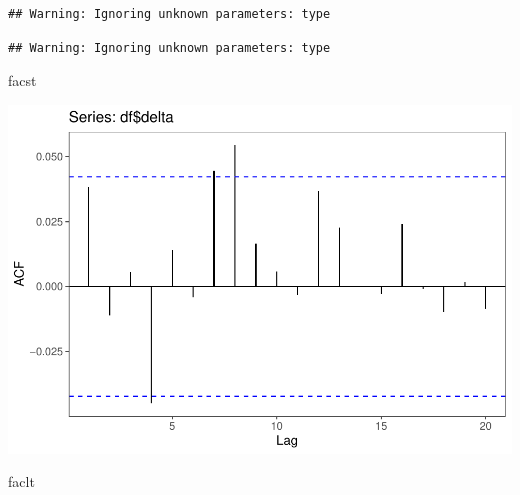 \documentclass[11pt, a4paper]{report}
\newenvironment{Shaded}{\begin{snugshade}}{\end{snugshade}}
\newcommand{\DataTypeTok}[1]{\textcolor[rgb]{0.13,0.29,0.53}{#1}}
\newcommand{\DecValTok}[1]{\textcolor[rgb]{0.00,0.00,0.81}{#1}}
\newcommand{\KeywordTok}[1]{\textcolor[rgb]{0.13,0.29,0.53}{\textbf{#1}}}
\newcommand{\NormalTok}[1]{#1}
\newcommand{\OperatorTok}[1]{\textcolor[rgb]{0.81,0.36,0.00}{\textbf{#1}}}
\newcommand{\StringTok}[1]{\textcolor[rgb]{0.31,0.60,0.02}{#1}}
\theoremstyle{plain}
\theoremstyle{plain}
\theoremstyle{remark}
\begin{document}
\begin{verbatim}
## Warning: Ignoring unknown parameters: type
\end{verbatim}

\begin{Shaded}
\end{Shaded}

\begin{verbatim}
## Warning: Ignoring unknown parameters: type
\end{verbatim}

\begin{Shaded}
\begin{Highlighting}[]
\NormalTok{facst}
\end{Highlighting}
\end{Shaded}

\begin{center}\includegraphics{Econo2_P1_files/figure-latex/plots-5} \end{center}

\begin{Shaded}
\begin{Highlighting}[]
\NormalTok{faclt}
\end{Highlighting}
\end{Shaded}
\end{document}
